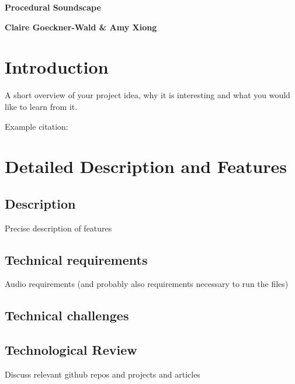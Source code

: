 \documentclass[12pt,a4paper]{article}
\begin{document}
\pagestyle{plain}
 

\begin{center}
{\LARGE{\bf
{{Procedural Soundscape}}
}}
\end{center}
\bigskip

\centerline{\bf 
{Claire Goeckner-Wald \& Amy Xiong}}

\bigskip



\section{Introduction}

A short overview of your project idea, why it is interesting and what you would like to learn from it.

Example citation: \cite{tonejs-instruments}


\section{Detailed Description and Features}

\subsection{Description}
Precise description of features
\subsection{Technical requirements}
Audio requirements (and probably also requirements necessary to run the files)
\subsection{Technical challenges}
\subsection{Technological Review}
Discuss relevant github repos and projects and articles
\end{document}
